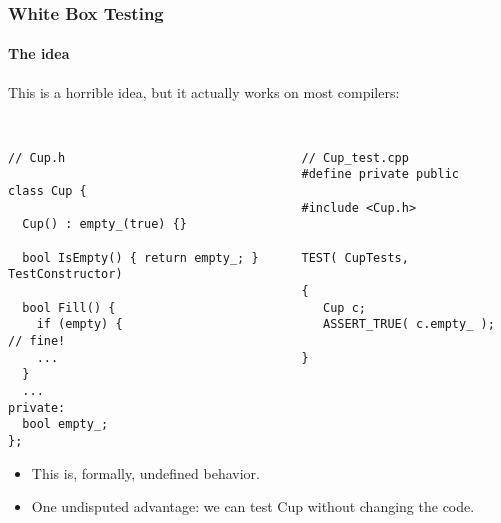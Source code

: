 \begin{frame}[fragile,t]
\frametitle{White Box Testing}
\framesubtitle {The idea}
This is a horrible idea, but it actually works on most compilers:
{\scriptsize\
\begin{verbatim}
// Cup.h                                 // Cup_test.cpp
                                         #define private public
class Cup {                              
                                         #include <Cup.h>
  Cup() : empty_(true) {}                
                                         
  bool IsEmpty() { return empty_; }      TEST( CupTests, TestConstructor)         
                                         {                                        
  bool Fill() {                             Cup c;                                
    if (empty) {                            ASSERT_TRUE( c.empty_ ); // fine!
    ...                                  }
  }
  ...
private:
  bool empty_;
};
\end{verbatim}}
\begin{itemize}
\item This is, formally, undefined behavior.
\item One undisputed advantage: we can test Cup without changing the code.
\end{itemize}
\begin{center}
\end{center}
\end{frame}

